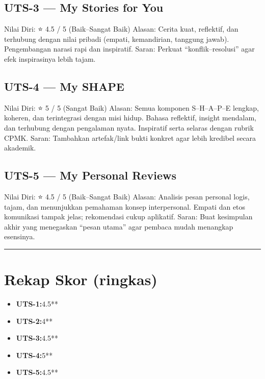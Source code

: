 \documentclass[
  letterpaper,
  DIV=11,
  numbers=noendperiod]{scrreprt}
\providecommand{\tightlist}{%
  \setlength{\itemsep}{0pt}\setlength{\parskip}{0pt}}\usepackage{longtable,booktabs,array}
\begin{document}
\subsection{UTS-3 --- My Stories for
You}\label{uts-3-my-stories-for-you-1}

Nilai Diri: ⭐ 4.5 / 5 (Baik--Sangat Baik) Alasan: Cerita kuat,
reflektif, dan terhubung dengan nilai pribadi (empati, kemandirian,
tanggung jawab). Pengembangan narasi rapi dan inspiratif. Saran: Perkuat
``konflik--resolusi'' agar efek inspirasinya lebih tajam.

\subsection{UTS-4 --- My SHAPE}\label{uts-4-my-shape}

Nilai Diri: ⭐ 5 / 5 (Sangat Baik) Alasan: Semua komponen S--H--A--P--E
lengkap, koheren, dan terintegrasi dengan misi hidup. Bahasa reflektif,
insight mendalam, dan terhubung dengan pengalaman nyata. Inspiratif
serta selaras dengan rubrik CPMK. Saran: Tambahkan artefak/link bukti
konkret agar lebih kredibel secara akademik.

\subsection{UTS-5 --- My Personal
Reviews}\label{uts-5-my-personal-reviews-1}

Nilai Diri: ⭐ 4.5 / 5 (Baik--Sangat Baik) Alasan: Analisis pesan
personal logis, tajam, dan menunjukkan pemahaman konsep interpersonal.
Empati dan etos komunikasi tampak jelas; rekomendasi cukup aplikatif.
Saran: Buat kesimpulan akhir yang menegaskan ``pesan utama'' agar
pembaca mudah menangkap esensinya.

\begin{center}\rule{0.5\linewidth}{0.5pt}\end{center}

\section{Rekap Skor (ringkas)}\label{rekap-skor-ringkas}

\begin{itemize}
\tightlist
\item
  \textbf{UTS-1:}4.5**
\item
  \textbf{UTS-2:}4**
\item
  \textbf{UTS-3:}4.5**
\item
  \textbf{UTS-4:}5**
\item
  \textbf{UTS-5:}4.5**
\end{itemize}
\end{document}

